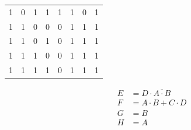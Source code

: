 \begin{table}[]
\begin{tabular}{|cc|cc|cc|cc|}
        1            & 0            & 1           & 1            & 1              & 1             & 0     & 1                          \\
        1            & 1            & 0           & 0            & 0              & 1             & 1     & 1                          \\
        1            & 1            & 0           & 1            & 0              & 1             & 1     & 1                          \\
        1            & 1            & 1           & 0            & 0              & 1             & 1     & 1                          \\
        1            & 1            & 1           & 1            & 0              & 1             & 1     & 1                          \\ \hline
    \end{tabular}
\end{table}




\begin{align*}
    E   &=  D \cdot \overline{A \cdot B}   \\
    F   &=  A \cdot B + C \cdot D     \\
    G   &=  B                             \\
    H   &=  A
    \label{eq:03:boolean_equation}
\end{align*}